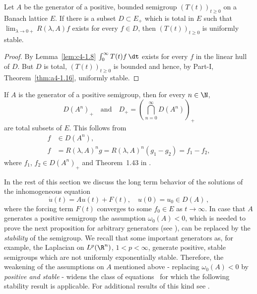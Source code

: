 \begin{proposition}\label{prop:c4-1.9}
%
Let $A$ be the generator of a positive, bounded semigroup $(T(t))_{t \geq 0}$ on a Banach lattice $E$.
If there is a subset $D \subset E_{+}$ which is total in $E$ such that $\lim_{\lambda \to 0+} R(\lambda,A)f$ exists for every $f \in D$, then $(T(t))_{t \geq 0}$ is uniformly stable.
\end{proposition}
\begin{proof}
By Lemma~\ref{lem:c4-1.8} $\int_{0}^{\infty} T(t)f \, \dt$ exists for every $f$ in the linear hull of\/ $D$.
But $D$ is total, $(T(t))_{t \geq 0}$ is bounded and hence, by Part-I, Theorem~\ref{thm:a4-1.16}, uniformly stable.
\end{proof}

\begin{remark}\label{rem:c4-1.10}
If\/ $A$ is the generator of a positive semigroup, then for every $n \in \N$, 
\[
D(A^{n})_{+}
\quad \text{and} \quad 
D_{+} =  \left(\bigcap_{n=0}^{\infty} D(A^{n})\right)_{+}
\]
are total subsets of\/ $E$.
This follows from 
\begin{align*}
    f &\in D(A^{n}), \\
    f &= R(\lambda,A)^{n}g = R(\lambda,A)^{n}(g_{1} - g_{2}) = f_{1} - f_{2},
\end{align*}
where $f_{1}$, $f_{2} \in D(A^{n})_{+}$ and Theorem~1.43 in \textcite{davies:1980}.
\end{remark}
In the rest of this section we discuss the long term behavior of the solutions of the inhomogeneous equation
\begin{equation}\label{eq:c4-1.6}
\dot{u}(t) = Au(t) + F(t), \quad u(0) = u_{0} \in D(A)\,,
\end{equation}
where the forcing term $F(t)$ converges to some $f_{0} \in E$ as $t \to \infty$.
In case that $A$ generates a positive semigroup the assumption \emph{$\omega_{0}(A) < 0$}, which is needed to prove the next proposition for arbitrary generators (see \textcite[ Theorem~4.4.4]{pazy:1983}), can be replaced by the \emph{stability} of the semigroup.
We recall that some important generators as, for example, the Laplacian on $L^{p}(\R^{n})$, $1 < p < \infty$, generate positive, stable semigroups which are not uniformly exponentially stable.
Therefore, the weakening of the assumptions on $A$ mentioned above - \ie  replacing \emph{$\omega_{0}(A) < 0$} by \emph{positive and stable} - widens the class of equations~ for which the following stability result is applicable.
For additional results of this kind see \textcite{neubrander:1985b}.

